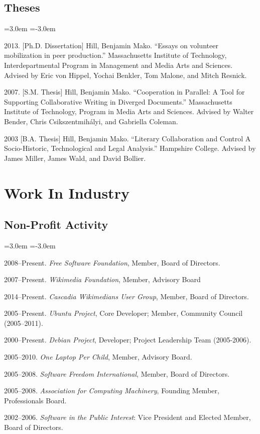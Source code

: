 \documentclass[10pt]{article}
\newenvironment{cvlist}{
\begin{list}{}{\leftmargin=3.0em \itemindent=-3.0em}
  \setlength{\itemsep}{0pt}
  \setlength{\parskip}{0em}
  \setlength{\parsep}{1em}
  \setlength{\parindent}{0em}}
{\vspace{1em}
\end{list}}
\begin{document}
\subsection{Theses}

\begin{cvlist}
\item 2013. [Ph.D. Dissertation] Hill, Benjamin Mako. ``Essays on volunteer mobilization in peer production.'' Massachusetts Institute of Technology, Interdepartmental Program in Management and Media Arts and Sciences. Advised by Eric von Hippel, Yochai Benkler, Tom Malone, and Mitch Resnick.
\item 2007. [S.M. Thesis] Hill, Benjamin Mako. ``Cooperation in Parallel: A Tool for Supporting Collaborative Writing in Diverged Documents.'' Massachusetts Institute of Technology, Program in Media Arts and Sciences. Advised by Walter Bender, Chris Csikszentmihályi, and Gabriella Coleman.
\item 2003 [B.A. Thesis] Hill, Benjamin Mako. ``Literary Collaboration and Control A Socio-Historic, Technological and Legal Analysis.'' Hampshire College. Advised by James Miller, James Wald, and David Bollier.
\end{cvlist}

\section{Work In Industry}

\subsection{Non-Profit Activity}
\begin{cvlist}
\item 2008--Present. \emph{Free Software Foundation}, Member, Board of Directors.
\item 2007--Present. \emph{Wikimedia Foundation}, Member, Advisory Board
\item 2014--Present. \emph{Cascadia Wikimedians User Group}, Member, Board of Directors.
\item 2005--Present. \emph{Ubuntu Project}, Core Developer; Member, Community Council (2005--2011).
\item 2000--Present. \emph{Debian Project}, Developer; Project Leadership Team (2005-2006).
\item 2005--2010. \emph{One Laptop Per Child}, Member, Advisory Board. %
\item 2005--2008. \emph{Software Freedom International}, Member, Board of Directors.
\item 2005--2008. \emph{Association for Computing Machinery}, Founding Member, Professionals Board.
\item 2002--2006. \emph{Software in the Public Interest}: Vice President and Elected Member, Board of Directors.
\end{cvlist}
\end{document}
